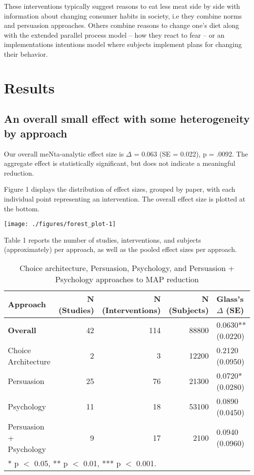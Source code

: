 \documentclass[sn-nature,pdflatex]{sn-jnl}
\begin{document}
These interventions typically suggest reasons to eat less meat side by
side with information about changing consumer habits in society, i.e
they combine norms and persuasion approaches. Others combine reasons to
change one's diet along with the extended parallel process model -- how
they react to fear \citep{fehrenbach2015} -- or an implementations
intentions model \citep{shreedhar2021} where subjects implement plans
for changing their behavior.

\section{Results}\label{sec2}

\subsection{An overall small effect with some heterogeneity by
approach}\label{sec2.1}

Our overall meNta-analytic effect size is \(\Delta\) = 0.063 (SE =
0.022), p = .0092. The aggregate effect is statistically significant,
but does not indicate a meaningful reduction.

Figure 1 displays the distribution of effect sizes, grouped by paper,
with each individual point representing an intervention. The overall
effect size is plotted at the bottom.

\texttt{[image: ./figures/forest\_plot-1]}

Table 1 reports the number of studies, interventions, and subjects
(approximately) per approach, as well as the pooled effect sizes per
approach.

\begin{table}[!h]
\centering
\caption{\label{tab:table_one}Choice architecture, Persuasion, Psychology, and Persuasion + Psychology approaches to MAP reduction}
\centering
\begin{tabular}[t]{lrrrl}
\toprule
Approach & N (Studies) & N (Interventions) & N (Subjects) & Glass's $\Delta$ (SE)\\
\midrule
\textbf{Overall} & 42 & 114 & 88800 & 0.0630** (0.0220)\\
Choice Architecture & 2 & 3 & 12200 & 0.2120 (0.0950)\\
Persuasion & 25 & 76 & 21300 & 0.0720* (0.0280)\\
Psychology & 11 & 18 & 53100 & 0.0890 (0.0450)\\
Persuasion + Psychology & 9 & 17 & 2100 & 0.0940 (0.0960)\\
\bottomrule
\multicolumn{5}{l}{\rule{0pt}{1em}* p $<$ 0.05, ** p $<$ 0.01, *** p $<$ 0.001.}\\
\end{tabular}
\end{table}
\end{document}
